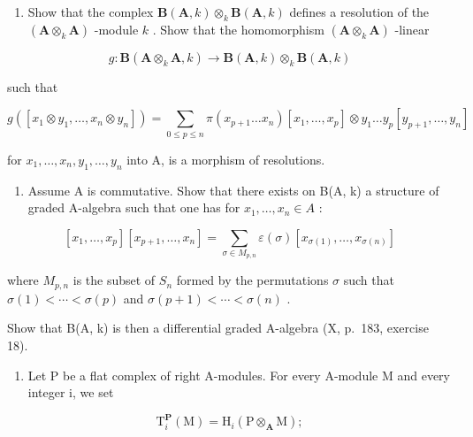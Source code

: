 \begin{enumerate}
\def\labelenumi{\alph{enumi})}
\tightlist
\item
  Show that the complex \(\mathbf{B}(\mathbf{A}, k) \otimes_k \mathbf{B}(\mathbf{A}, k)\) defines a resolution of the \((\mathbf{A} \otimes_k \mathbf{A})\) -module \(k\) . Show that the homomorphism \((\mathbf{A} \otimes_k \mathbf{A})\) -linear
\end{enumerate}

\[
g: \mathbf {B} (\mathbf {A} \otimes_ {k} \mathbf {A}, k) \rightarrow \mathbf {B} (\mathbf {A}, k) \otimes_ {k} \mathbf {B} (\mathbf {A}, k)
\]

such that

\[
g \left(\left[ x _ {1} \otimes y _ {1}, \dots , x _ {n} \otimes y _ {n} \right]\right) = \sum_ {0 \leqslant p \leqslant n} \pi \left(x _ {p + 1} \dots x _ {n}\right) \left[ x _ {1}, \dots , x _ {p} \right] \otimes y _ {1} \dots y _ {p} \left[ y _ {p + 1}, \dots , y _ {n} \right]
\]

for \(x_{1},\ldots,x_{n},y_{1},\ldots,y_{n}\) into A, is a morphism of resolutions.

\begin{enumerate}
\def\labelenumi{\alph{enumi})}
\setcounter{enumi}{1}
\tightlist
\item
  Assume A is commutative. Show that there exists on B(A, k) a structure of graded A-algebra such that one has for \(x_{1}, \ldots, x_{n} \in A\) :
\end{enumerate}

\[
\left[ x _ {1}, \dots , x _ {p} \right] \left[ x _ {p + 1}, \dots , x _ {n} \right] = \sum_ {\sigma \in M _ {p, n}} \varepsilon (\sigma) \left[ x _ {\sigma (1)}, \dots , x _ {\sigma (n)} \right]
\]

where \(M_{p,n}\) is the subset of \(S_{n}\) formed by the permutations \(\sigma\) such that \(\sigma(1) < \cdots < \sigma(p)\) and \(\sigma(p + 1) < \cdots < \sigma(n)\) .

Show that B(A, k) is then a differential graded A-algebra (X, p.~183, exercise 18).

\begin{enumerate}
\def\labelenumi{\arabic{enumi})}
\setcounter{enumi}{5}
\tightlist
\item
  Let P be a flat complex of right A-modules. For every A-module M and every integer i, we set
\end{enumerate}

\[
\mathrm{T} _ {i} ^ {\mathbf {P}} (\mathrm{M}) = \mathrm{H} _ {i} (\mathrm{P} \otimes_ {\mathbf {A}} \mathrm{M});
\]

